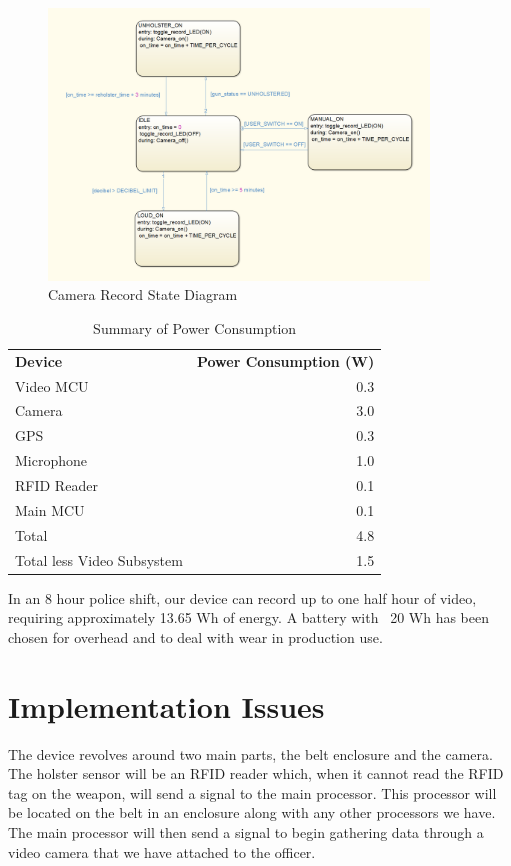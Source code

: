 \documentclass[12pt]{article}
\begin{document}
\begin{figure}[h!]
    \centering
    \includegraphics[width=0.9\textwidth]{state_diagram}
    \caption{Camera Record State Diagram}
\end{figure}

\begin{table}[h!]
    \centering
    \caption{Summary of Power Consumption}
    \begin{tabular}{lr}
        \textbf{Device} & \textbf{Power Consumption (W)}\\
        Video MCU & 0.3\\
        Camera & 3.0\\
        GPS & 0.3\\
        Microphone & 1.0\\
        RFID Reader & 0.1\\
        Main MCU & 0.1\\
        Total & 4.8\\
        Total less Video Subsystem & 1.5\\
    \end{tabular}
\end{table}

In an 8 hour police shift, our device can record up to one half hour of video,
requiring approximately 13.65 Wh of energy. A battery with ~20 Wh has been
chosen for overhead and to deal with wear in production use.

\section{Implementation Issues}

The device revolves around two main parts, the belt enclosure and the camera.
The holster sensor will be an RFID reader which, when it cannot read the RFID
tag on the weapon, will send a signal to the main processor. This processor
will be located on the belt in an enclosure along with any other processors we
have. The main processor will then send a signal to begin gathering data
through a video camera that we have attached to the officer. 
\end{document}
